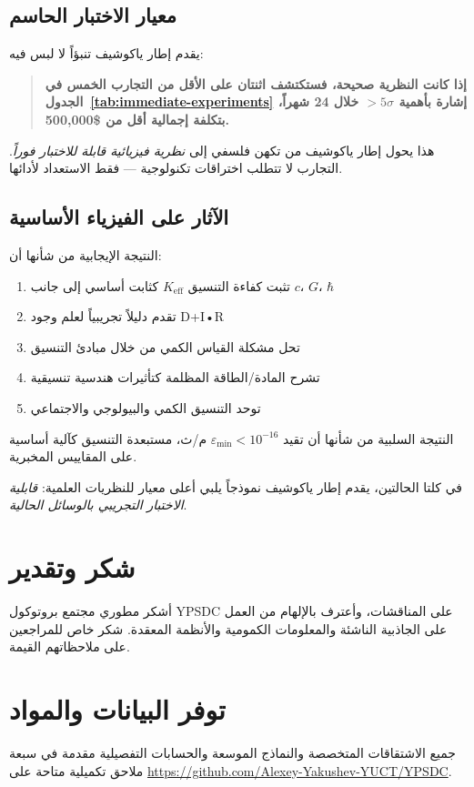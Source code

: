 \documentclass[11pt,a4paper]{article}
\begin{document}
	\subsection{معيار الاختبار الحاسم}
	
	يقدم إطار ياكوشيف تنبؤاً لا لبس فيه:
	
	\begin{quote}
		\textbf{إذا كانت النظرية صحيحة، فستكتشف اثنتان على الأقل من التجارب الخمس في الجدول~\ref{tab:immediate-experiments} إشارة بأهمية $>5\sigma$ خلال 24 شهراً، بتكلفة إجمالية أقل من \$500,000.}
	\end{quote}
	
	هذا يحول إطار ياكوشيف من تكهن فلسفي إلى \emph{نظرية فيزيائية قابلة للاختبار فوراً}. التجارب لا تتطلب اختراقات تكنولوجية — فقط الاستعداد لأدائها.
	
	\subsection{الآثار على الفيزياء الأساسية}
	
	النتيجة الإيجابية من شأنها أن:
	\begin{enumerate}
		\item تثبت كفاءة التنسيق $K_{\mathrm{eff}}$ كثابت أساسي إلى جانب $c$، $G$، $\hbar$
		\item تقدم دليلاً تجريبياً لعلم وجود D+I•R
		\item تحل مشكلة القياس الكمي من خلال مبادئ التنسيق
		\item تشرح المادة/الطاقة المظلمة كتأثيرات هندسية تنسيقية
		\item توحد التنسيق الكمي والبيولوجي والاجتماعي
	\end{enumerate}
	
	النتيجة السلبية من شأنها أن تقيد $\varepsilon_{\min} < 10^{-16}$ م/ث، مستبعدة التنسيق كآلية أساسية على المقاييس المخبرية.
	
	في كلتا الحالتين، يقدم إطار ياكوشيف نموذجاً يلبي أعلى معيار للنظريات العلمية: \emph{قابلية الاختبار التجريبي بالوسائل الحالية}.
	
	\section*{شكر وتقدير}
	أشكر مطوري مجتمع بروتوكول YPSDC على المناقشات، وأعترف بالإلهام من العمل على الجاذبية الناشئة والمعلومات الكمومية والأنظمة المعقدة. شكر خاص للمراجعين على ملاحظاتهم القيمة.
	
	\section*{توفر البيانات والمواد}
	جميع الاشتقاقات المتخصصة والنماذج الموسعة والحسابات التفصيلية مقدمة في سبعة ملاحق تكميلية متاحة على \url{https://github.com/Alexey-Yakushev-YUCT/YPSDC}.
	
\end{document}
